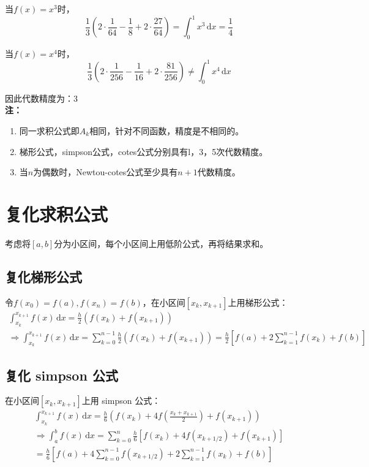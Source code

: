 \documentclass[UTF8,a4paper,11pt,oneside]{ctexbook}
\begin{document}
当\(f(x)=x^3\)时，
\[
\frac{1}{3}\left(2\cdot\frac{1}{64}-\frac{1}{8}+2\cdot\frac{27}{64}\right)=\int_0^1x^3\,\mathrm{d}x=\frac{1}{4}
\]

当\(f(x)=x^4\)时，
\[
\frac{1}{3}\left(2\cdot\frac{1}{256}-\frac{1}{16}+2\cdot\frac{81}{256}\right)\neq\int_0^1x^4\,\mathrm{d}x
\]

因此代数精度为：3\\
\textbf{注：}
\begin{enumerate}
    \item 同一求积公式即\(A_k\)相同，针对不同函数，精度是不相同的。
    \item 梯形公式，simpson公式，cotes公式分别具有l，3，5次代数精度。
    \item 当\(n\)为偶数时，Newtou-cotes公式至少具有\(n+1\)代数精度。
\end{enumerate}

\section{复化求积公式}

考虑将\([a,b]\)分为小区间，每个小区间上用低阶公式，再将结果求和。

\subsection{复化梯形公式}

令\(f(x_0)=f(a),f(x_n)=f(b)\)，在小区间\([x_k,x_{k+1}]\)上用梯形公式：
\begin{gather*}
\int_{x_k}^{x_{k+1}}f(x)\,\mathrm{d}x=\frac{h}{2}(f(x_k)+f(x_{k+1}))\\
\Rightarrow\int_{x_k}^{x_{k+1}}f(x)\,\mathrm{d}x=\sum_{k=0}^{n-1}\frac{h}{2}(f(x_k)+f(x_{k+1}))=\frac{h}{2}\left[f(a)+2\sum_{k=1}^{n-1}f(x_k)+f(b)\right]
\end{gather*}

\subsection{复化 simpson 公式}

在小区间\([x_k,x_{k+1}]\)上用 simpson 公式：
\begin{gather*}
\int_{x_k}^{x_{k+1}}f(x)\,\mathrm{d}x=\frac{h}{6}\left(f(x_k)+4f\left(\frac{x_k+x_{k+1}}{2}\right)+f(x_{k+1})\right)\\
\Rightarrow\int_a^bf(x)\,\mathrm{d}x=\sum_{k=0}^n\frac{h}{6}\left[f(x_k)+4f(x_{k+1/2})+f(x_{k+1})\right]\\
=\frac{h}{6}\left[f(a)+4\sum_{k=0}^{n-1}f(x_{k+1/2})+2\sum_{k=1}^{n-1}f(x_k)+f(b)\right]
\end{gather*}
\end{document}
